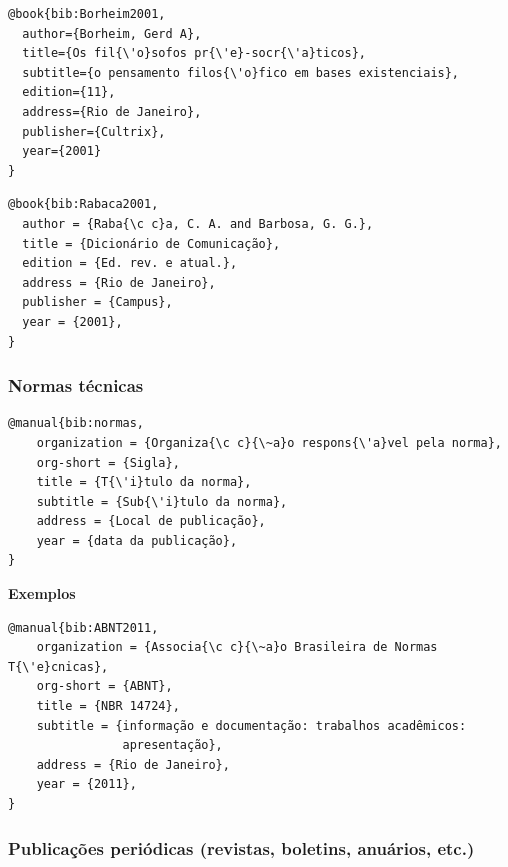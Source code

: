 \documentclass[a4paper,12pt,oneside,onecolumn,final,fleqn]{repUERJ}
\begin{document}
\noindent{}

\begin{verbatim}
@book{bib:Borheim2001,
  author={Borheim, Gerd A},
  title={Os fil{\'o}sofos pr{\'e}-socr{\'a}ticos},
  subtitle={o pensamento filos{\'o}fico em bases existenciais},
  edition={11},
  address={Rio de Janeiro},
  publisher={Cultrix},
  year={2001}
}
\end{verbatim}

\noindent{}

\begin{verbatim}
@book{bib:Rabaca2001,
  author = {Raba{\c c}a, C. A. and Barbosa, G. G.},
  title = {Dicionário de Comunicação},
  edition = {Ed. rev. e atual.},
  address = {Rio de Janeiro},
  publisher = {Campus},
  year = {2001},
}
\end{verbatim}

\subsubsection{Normas técnicas}

\noindent{}

\begin{verbatim}
@manual{bib:normas,
    organization = {Organiza{\c c}{\~a}o respons{\'a}vel pela norma},
    org-short = {Sigla},
    title = {T{\'i}tulo da norma},
    subtitle = {Sub{\'i}tulo da norma},
    address = {Local de publicação},
    year = {data da publicação},
}
\end{verbatim}

\noindent\textbf{Exemplos}\\

\noindent{}

\begin{verbatim}
@manual{bib:ABNT2011,
    organization = {Associa{\c c}{\~a}o Brasileira de Normas T{\'e}cnicas},
    org-short = {ABNT},
    title = {NBR 14724},
    subtitle = {informação e documentação: trabalhos acadêmicos: 
                apresentação},
    address = {Rio de Janeiro},
    year = {2011},
}
\end{verbatim}

\subsubsection{Publicações periódicas (revistas, boletins, anuários, etc.)}
\end{document}
